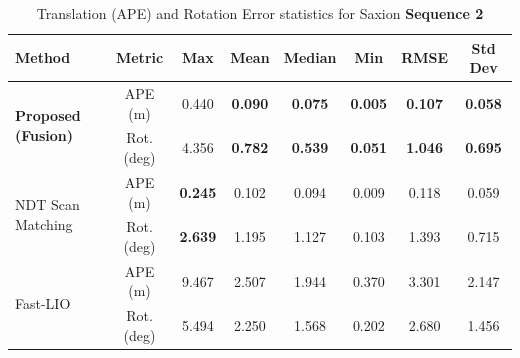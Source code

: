 \begin{table}[H]
	\centering
	\renewcommand{\arraystretch}{0.6}
	\setlength{\tabcolsep}{15pt}
	\caption{Translation (APE) and Rotation Error statistics for Saxion \textbf{Sequence 2} }
	\label{tab:ape_rot_saxion_seq2}
	
	\begin{adjustbox}{width=\textwidth}
		\begin{tabular}{@{}lccccccc@{}}
			\toprule
			\textbf{Method} & \textbf{Metric} & \textbf{Max} & \textbf{Mean} & \textbf{Median} & \textbf{Min} & \textbf{RMSE} & \textbf{Std Dev} \\
			\midrule
			
			\multirow{2}{*}{\textbf{Proposed (Fusion)}} 
			& APE (m)        & 0.440   & \textbf{0.090}   & \textbf{0.075}     & \textbf{0.005}   & \textbf{0.107}   & \textbf{0.058} \\
			& Rot. (deg)     & 4.356   & \textbf{0.782}   & \textbf{0.539}     & \textbf{0.051}   & \textbf{1.046}   & \textbf{0.695} \\
			\midrule
			
			\multirow{2}{*}{NDT Scan Matching} 
			& APE (m)        & \textbf{0.245}   & 0.102   & 0.094     & 0.009    & 0.118   & 0.059 \\
			& Rot. (deg)     & \textbf{2.639}   & 1.195   & 1.127     & 0.103    & 1.393   & 0.715 \\
			\midrule
			
			\multirow{2}{*}{Fast-LIO} 
			& APE (m)        & 9.467   & 2.507   & 1.944     & 0.370    & 3.301   & 2.147 \\
			& Rot. (deg)     & 5.494   & 2.250   & 1.568     & 0.202    & 2.680   & 1.456 \\
			\bottomrule
		\end{tabular}
	\end{adjustbox}
\end{table}

